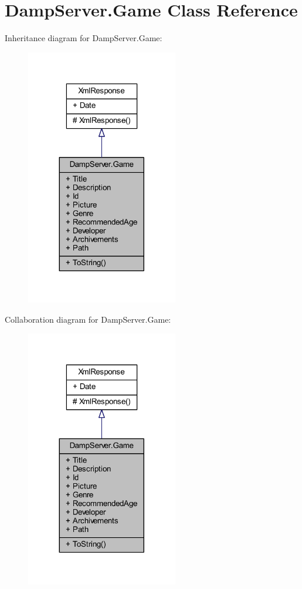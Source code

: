 \hypertarget{class_damp_server_1_1_game}{\section{Damp\-Server.\-Game Class Reference}
\label{class_damp_server_1_1_game}
}


Inheritance diagram for Damp\-Server.\-Game\-:\nopagebreak
\begin{figure}[H]
\begin{center}
\leavevmode
\includegraphics[width=188pt]{class_damp_server_1_1_game__inherit__graph}
\end{center}
\end{figure}


Collaboration diagram for Damp\-Server.\-Game\-:\nopagebreak
\begin{figure}[H]
\begin{center}
\leavevmode
\includegraphics[width=188pt]{class_damp_server_1_1_game__coll__graph}
\end{center}
\end{figure}
